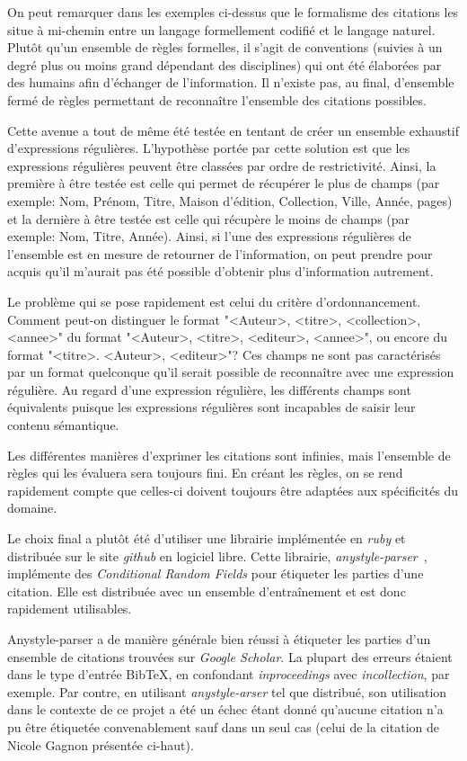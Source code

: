 On peut remarquer dans les exemples ci-dessus que le formalisme des citations les situe à mi-chemin entre un langage formellement codifié et le langage naturel. Plutôt qu'un ensemble de règles formelles, il s'agit de conventions (suivies à un degré plus ou moins grand dépendant des disciplines) qui ont été élaborées par des humains afin d'échanger de l'information. Il n'existe pas, au final, d'ensemble fermé de règles permettant de reconnaître l'ensemble des citations possibles.

Cette avenue a tout de même été testée en tentant de créer un ensemble exhaustif d'expressions régulières. L'hypothèse portée par cette solution est que les expressions régulières peuvent être classées par ordre de restrictivité. Ainsi, la première à être testée est celle qui permet de récupérer le plus de champs (par exemple: Nom, Prénom, Titre, Maison d'édition, Collection, Ville, Année, pages) et la dernière à être testée est celle qui récupère le moins de champs (par exemple: Nom, Titre, Année). Ainsi, si l'une des expressions régulières de l'ensemble est en mesure de retourner de l'information, on peut prendre pour acquis qu'il m'aurait pas été possible d'obtenir plus d'information autrement.

Le problème qui se pose rapidement est celui du critère d'ordonnancement. Comment peut-on distinguer le format "<Auteur>, <titre>, <collection>, <annee>" du format "<Auteur>, <titre>, <editeur>, <annee>", ou encore du format "<titre>. <Auteur>, <editeur>"? Ces champs ne sont pas caractérisés par un format quelconque qu'il serait possible de reconnaître avec une expression régulière. Au regard d'une expression régulière, les différents champs sont équivalents puisque les expressions régulières sont incapables de saisir leur contenu sémantique.

Les différentes manières d'exprimer les citations sont infinies, mais l'ensemble de règles qui les évaluera sera toujours fini. En créant les règles, on se rend rapidement compte que celles-ci doivent toujours être adaptées aux spécificités du domaine. 

Le choix final a plutôt été d'utiliser une librairie implémentée en \emph{ruby} et distribuée sur le site \emph{github} en logiciel libre. Cette librairie, \emph{anystyle-parser}~\cite{anystyleparser}, implémente des \emph{Conditional Random Fields} pour étiqueter les parties d'une citation. Elle est distribuée avec un ensemble d'entraînement et est donc rapidement utilisables.

Anystyle-parser a de manière générale bien réussi à étiqueter les parties d'un ensemble de citations trouvées sur \emph{Google Scholar}. La plupart des erreurs étaient dans le type d'entrée BibTeX, en confondant \emph{inproceedings} avec \emph{incollection}, par exemple. Par contre, en utilisant \emph{anystyle-arser} tel que distribué, son utilisation dans le contexte de ce projet a été un échec étant donné qu'aucune citation n'a pu être étiquetée convenablement sauf dans un seul cas (celui de la citation de Nicole Gagnon présentée ci-haut).

